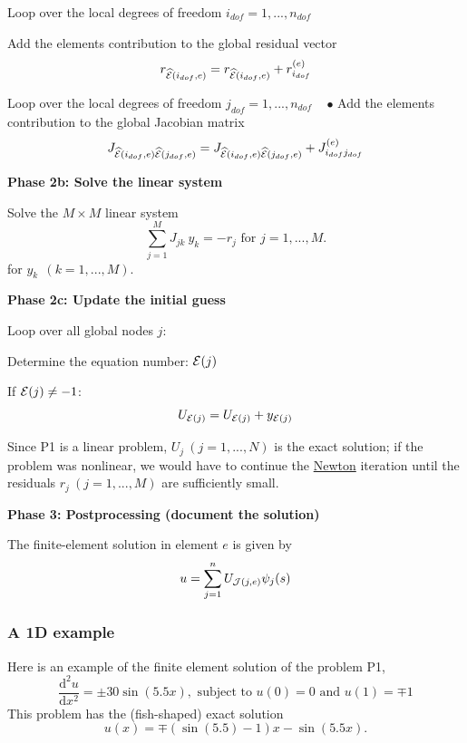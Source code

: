 \begin{DoxyItemize}
\begin{DoxyItemize}
\item Loop over the local degrees of freedom $ i_{dof}=1,...,n_{dof} $
\begin{DoxyItemize}
\item Add the element\textquotesingle{}s contribution to the global residual vector \[ r_{\widehat{\cal E}(i_{dof},e)} = r_{\widehat{\cal E}(i_{dof},e)} + r_{i_{dof}}^{(e)} \]
\item Loop over the local degrees of freedom $ j_{dof}=1,...,n_{dof}$ ~\newline
 $\bullet $ Add the element\textquotesingle{}s contribution to the global Jacobian matrix \[ J_{\widehat{\cal E}(i_{dof},e)\widehat{\cal E}(j_{dof},e) } = J_{\widehat{\cal E}(i_{dof},e)\widehat{\cal E}(j_{dof},e) } + J_{i_{dof} j_{dof}}^{(e)} \]
\end{DoxyItemize}
\end{DoxyItemize}{\bfseries  Phase 2b\+: Solve the linear system }
\item Solve the $ M \times M$ linear system \[ \sum_{j=1}^{M} J_{jk} \ y_k = - r_j \mbox{\ \ \ for $j=1,...,M.$} \] for $ y_k \ \ (k=1,...,M).$

{\bfseries  Phase 2c\+: Update the initial guess }
\item Loop over all global nodes $ j$\+:
\begin{DoxyItemize}
\item Determine the equation number\+: $ {\cal E}(j) $
\item If $ {\cal E}(j) \ne -1 $\+: \[ U_{{\cal E}(j)} = U_{{\cal E}(j)} + y_{{\cal E}(j)} \]
\end{DoxyItemize}
\item Since P1 is a linear problem, $ U_j \ (j=1,...,N) $ is the exact solution; if the problem was nonlinear, we would have to continue the \hyperlink{index_Newton}{Newton} iteration until the residuals $r_j \ (j=1,...,M) $ are sufficiently small.

{\bfseries  Phase 3\+: Postprocessing (document the solution)}
\item The finite-\/element solution in element $e$ is given by \[ u = \sum_{j=1}^{n} U_{{\cal J}(j,e)} \psi_j(s) \]




\end{DoxyItemize}\hypertarget{index_example_P1}{}\subsubsection{A 1\+D example}\label{index_example_P1}
Here is an example of the finite element solution of the problem P1, \[ \frac{\mbox{d}^2 u}{\mbox{d} x^2} = \pm 30 \sin(5.5 x), \mbox{\ \ \ subject to $u(0)=0$ and $u(1)=\mp 1$} \] This problem has the (fish-\/shaped) exact solution \[ u(x) = \mp \left(\sin(5.5)-1\right) x - \sin(5.5 x). \]

